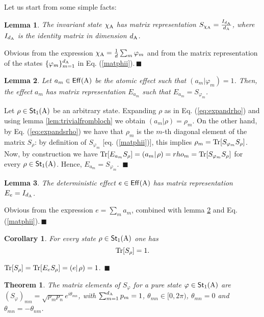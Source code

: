 \documentclass[12pt,aps,pra,showpacs,groupedaddress]{revtex4-1}
\newtheorem{lemma}{Lemma} \newtheorem{proposition}{Proposition}
\newtheorem{corollary}{Corollary} \newtheorem{theorem}{Theorem}
\def\Proof{\medskip\par\noindent{\bf Proof. }}
\def\qed{$\,\blacksquare$\par}
\def\Cntset{{\mathsf{Eff}}}
\def\Stset{{\mathsf{St}}}
\def\SC#1#2{\left(#1\right|\left.\!#2\right)}  \def\Tr{{\rm Tr}}
\begin{document}
 Let us start from some simple facts:


\begin{lemma}
  The invariant state $\chi_{\rm A}$ has matrix representation $S_{\chi_{\rm A}}=\frac {I_{d_{\rm A}}}{d_{\rm A}}$,
  where $I_{d_{\rm A}}$ is the identity matrix in dimension $d_{\rm A}$.
\end{lemma}

\Proof Obvious from the expression $\chi_{\rm A} =\frac1d\sum_m\varphi_m$ and from the matrix
representation of the states $\{\varphi_m\}_{m=1}^{d_{\rm A}}$ in Eq. (\ref{matphii}).\qed
 
 \begin{lemma}\label{lem:matai}
   Let $a_m \in\Cntset(\rA)$ be the atomic effect such that $\SC {a_m} {\varphi_m}  =1$.  Then, the effect $a_{m}$ has matrix representation $E_{a_m}$ such
   that $E_{a_{m}}=S_{\varphi_m}$.
\end{lemma}

\Proof Let $\rho\in\Stset_1 (\rA)$ be an arbitrary state.  Expanding $\rho$ as in Eq. (\ref{eq:expandrho})  and using lemma \ref{lem:trivialfrombloch} we obtain $\SC {a_m} {\rho}  = \rho_m$.  On the other hand, by Eq. (\ref{eq:expandsrho}) we have that $\rho_m$ is the $m$-th diagonal element of the matrix $S_\rho$: by definition of $S_{\varphi_m}$ [eq.  (\ref{matphii})], this implies  $\rho_m =  \Tr [  S_{\varphi_m}   S_\rho  ]$.     Now, by construction we have $\Tr[E_{a_m}  S_\rho]  =  \SC {a_m} \rho = rho_m =  \Tr[S_{\varphi_m}  S_\rho]$ for every $\rho \in \Stset_1 (\rA)$. Hence, $E_{a_m}  =  S_{\varphi_m}$. \qed

\begin{lemma}
  The deterministic effect $e\in\Cntset(\rA)$ has matrix representation $E_e=I_{d_{\rm A}}$.
\end{lemma}

\Proof Obvious from the expression $e= \sum_m a_{m}$, combined with lemma \ref{lem:matai} and Eq.
(\ref{matphii}).\qed

\begin{corollary}\label{cor:unittrace}
  For every  state $\rho \in \Stset_1 (\rA)$ one has
  \begin{equation*}
    \Tr[S_\rho]=1.
  \end{equation*}
\end{corollary}
\Proof $\Tr[ S_{\rho}] = \Tr[E_e S_\rho] = \SC e \rho = 1$. \qed


\begin{theorem}\label{theo:sqrts}
  The matrix elements of $S_\varphi$ for a pure state $\varphi\in\Stset_1 (\rA)$ are
  $(S_{\varphi})_{mn}=\sqrt{p_m p_n}e^{i\theta_{mn}}$, with   $\sum_{m=1}^{d_{\rm A}}   p_m  =1$,   $\theta_{mn}  \in [0, 2\pi)$, $\theta_{mn}=0$ and
  $\theta_{mn}=-\theta_{nm}$.
\end{theorem}
\end{document}
